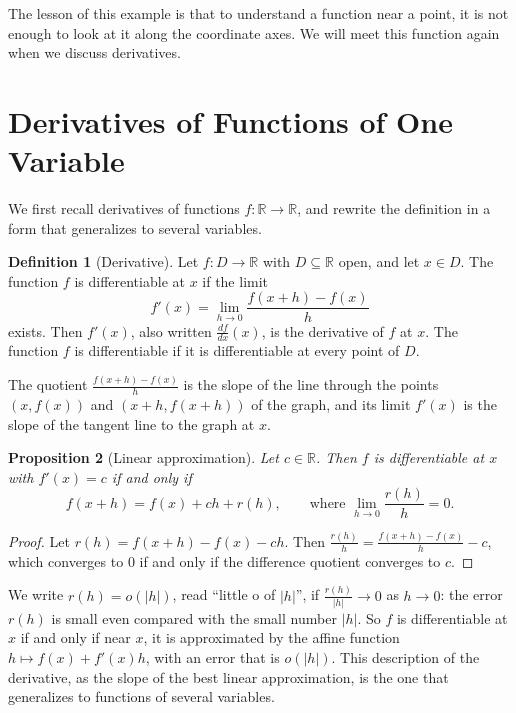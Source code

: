\documentclass[11pt]{article}
\theoremstyle{definition}
\newtheorem{definition}{Definition}[section]
\theoremstyle{plain}
\newtheorem{proposition}[definition]{Proposition}
\theoremstyle{remark}
\begin{document}
The lesson of this example is that to understand a function near a point, it is not enough to look at it along the coordinate axes. We will meet this function again when we discuss derivatives.

\section{Derivatives of Functions of One Variable}\label{sec:univariate}

We first recall derivatives of functions $f: \mathbb{R} \to \mathbb{R}$, and rewrite the definition in a form that generalizes to several variables.

\begin{definition}[Derivative]\label{def:derivative}
    Let $f: D \to \mathbb{R}$ with $D \subseteq \mathbb{R}$ open, and let $x \in D$. The function $f$ is differentiable at $x$ if the limit
    \[f'(x) = \lim_{h \to 0} \frac{f(x + h) - f(x)}{h}\]
    exists. Then $f'(x)$, also written $\frac{df}{dx}(x)$, is the derivative of $f$ at $x$. The function $f$ is differentiable if it is differentiable at every point of $D$.
\end{definition}

The quotient $\frac{f(x + h) - f(x)}{h}$ is the slope of the line through the points $(x, f(x))$ and $(x + h, f(x + h))$ of the graph, and its limit $f'(x)$ is the slope of the tangent line to the graph at $x$.

\begin{proposition}[Linear approximation]\label{prop:linear-approx-1d}
    Let $c \in \mathbb{R}$. Then $f$ is differentiable at $x$ with $f'(x) = c$ if and only if
    \[f(x + h) = f(x) + c h + r(h), \qquad \text{where } \lim_{h \to 0} \frac{r(h)}{h} = 0.\]
\end{proposition}

\begin{proof}
    Let $r(h) = f(x + h) - f(x) - ch$. Then $\frac{r(h)}{h} = \frac{f(x + h) - f(x)}{h} - c$, which converges to $0$ if and only if the difference quotient converges to $c$.
\end{proof}

We write $r(h) = o(|h|)$, read ``little o of $|h|$'', if $\frac{r(h)}{|h|} \to 0$ as $h \to 0$: the error $r(h)$ is small even compared with the small number $|h|$. So $f$ is differentiable at $x$ if and only if near $x$, it is approximated by the affine function $h \mapsto f(x) + f'(x) h$, with an error that is $o(|h|)$. This description of the derivative, as the slope of the best linear approximation, is the one that generalizes to functions of several variables.
\end{document}
